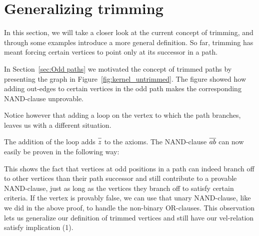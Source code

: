 

\section{Generalizing trimming}
\label{sec:Generalizing trimming}
In this section, we will take a closer look at the current concept of trimming, and through some examples introduce a more general definition.
So far, trimming has meant forcing certain vertices to point only at its successor in a path.

In Section~\ref{sec:Odd paths} we motivated the concept of trimmed paths by presenting the graph in Figure~\ref{fig:kernel_untrimmed}.
The figure showed how adding out-edges to certain vertices in the odd path makes the corresponding NAND-clause unprovable.

Notice however that adding a loop on the vertex to which the path branches, leaves us with a different situation.\par
\begin{figure}[!h]
  \centering
  \caption{}
  \label{fig:path_3_with_loop}
\end{figure}
The addition of the loop adds $\ol{z}$ to the axioms.
The NAND-clause $\ol{ab}$ can now easily be proven in the following way:\par
\begin{figure}[!h]
  \centering
  \begin{prooftree*}
  \end{prooftree*}
  \caption{}
  \label{fig:proof_loop}
\end{figure}
This shows the fact that vertices at odd positions in a path can indeed branch off to other vertices than their path successor and still contribute to a provable NAND-clause, just as long as the vertices they branch off to satisfy certain criteria.
If the vertex is provably false, we can use that unary NAND-clause, like we did in the above proof, to handle the non-binary OR-clauses.
This observation lets us generalize our definition of trimmed vertices and still have our vel-relation satisfy implication (1).

